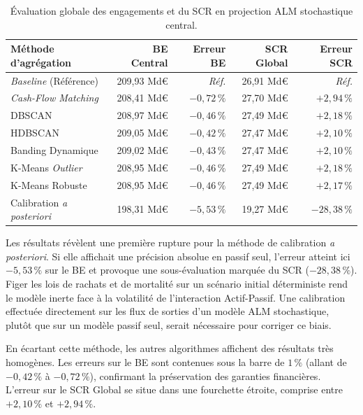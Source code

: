 \begin{table}[H]
    \centering
    \renewcommand{\arraystretch}{1.4}
    \begin{tabular}{|l|r|r|r|r|}
        \hline
        \textbf{Méthode d'agrégation} & \textbf{BE Central} & \textbf{Erreur BE} & \textbf{SCR Global} & \textbf{Erreur SCR} \\
        \hline
        \textit{Baseline} (Référence) & 209{,}93 Md\euro{} & \textit{Réf.} & 26{,}91 Md\euro{} & \textit{Réf.} \\
        \textit{Cash-Flow Matching} & 208{,}41 Md\euro{} & $-0{,}72\,\%$ & 27{,}70 Md\euro{} & $+2{,}94\,\%$ \\
        DBSCAN & 208{,}97 Md\euro{} & $-0{,}46\,\%$ & 27{,}49 Md\euro{} & $+2{,}18\,\%$ \\
        HDBSCAN & 209{,}05 Md\euro{} & $-0{,}42\,\%$ & 27{,}47 Md\euro{} & $+2{,}10\,\%$ \\
        Banding Dynamique & 209{,}02 Md\euro{} & $-0{,}43\,\%$ & 27{,}47 Md\euro{} & $+2{,}10\,\%$ \\
        K-Means \textit{Outlier} & 208{,}95 Md\euro{} & $-0{,}46\,\%$ & 27{,}49 Md\euro{} & $+2{,}18\,\%$ \\
        K-Means Robuste & 208{,}95 Md\euro{} & $-0{,}46\,\%$ & 27{,}49 Md\euro{} & $+2{,}17\,\%$ \\
        Calibration \textit{a posteriori} & 198{,}31 Md\euro{} & $-5{,}53\,\%$ & 19{,}27 Md\euro{} & $-28{,}38\,\%$ \\
        \hline
    \end{tabular}
    \caption{Évaluation globale des engagements et du SCR en projection ALM stochastique central.}
    \label{tab:resultats_central_alm}
\end{table}

Les résultats révèlent une première rupture pour la méthode de calibration \textit{a posteriori}. Si elle affichait une précision absolue en passif seul, l'erreur atteint ici $-5{,}53\,\%$ sur le BE et provoque une sous-évaluation marquée du SCR ($-28{,}38\,\%$). Figer les lois de rachats et de mortalité sur un scénario initial déterministe rend le modèle inerte face à la volatilité de l'interaction Actif-Passif. Une calibration effectuée directement sur les flux de sorties d'un modèle ALM stochastique, plutôt que sur un modèle passif seul, serait nécessaire pour corriger ce biais.

En écartant cette méthode, les autres algorithmes affichent des résultats très homogènes. Les erreurs sur le BE sont contenues sous la barre de $1\,\%$ (allant de $-0{,}42\,\%$ à $-0{,}72\,\%$), confirmant la préservation des garanties financières. L'erreur sur le SCR Global se situe dans une fourchette étroite, comprise entre $+2{,}10\,\%$ et $+2{,}94\,\%$. 

